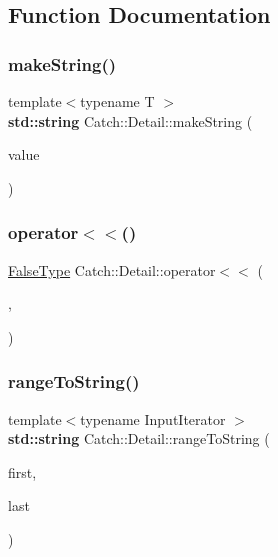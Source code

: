 \subsection{Function Documentation}
\mbox{\label{namespace_catch_1_1_detail_aef46b4178e08758524d25d1d969a503c}} 
\subsubsection{\texorpdfstring{make\+String()}{makeString()}}
{\footnotesize\ttfamily template$<$typename T $>$ \\
\textbf{ std\+::string} Catch\+::\+Detail\+::make\+String (\begin{DoxyParamCaption}\item[{T const \&}]{value }\end{DoxyParamCaption})}

\mbox{\label{namespace_catch_1_1_detail_ae9a44d574c4fbd18fabaaee05a433d88}} 
\subsubsection{\texorpdfstring{operator$<$$<$()}{operator<<()}}
{\footnotesize\ttfamily \hyperlink{struct_catch_1_1_detail_1_1_false_type}{False\+Type} Catch\+::\+Detail\+::operator$<$$<$ (\begin{DoxyParamCaption}\item[{\textbf{ std\+::ostream} const \&}]{,  }\item[{\hyperlink{struct_catch_1_1_detail_1_1_borg_type}{Borg\+Type} const \&}]{ }\end{DoxyParamCaption})}

\mbox{\label{namespace_catch_1_1_detail_a6650a1dff325bf29962ff15ae73fd972}} 
\subsubsection{\texorpdfstring{range\+To\+String()}{rangeToString()}}
{\footnotesize\ttfamily template$<$typename Input\+Iterator $>$ \\
\textbf{ std\+::string} Catch\+::\+Detail\+::range\+To\+String (\begin{DoxyParamCaption}\item[{Input\+Iterator}]{first,  }\item[{Input\+Iterator}]{last }\end{DoxyParamCaption})}

